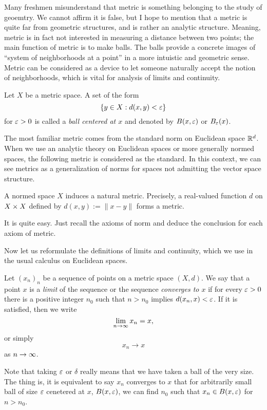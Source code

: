 \documentclass{../crs}
\begin{document}
Many freshmen misunderstand that metric is something belonging to the study of geoemtry.
We cannot affirm it is false, but I hope to mention that a metric is quite far from geometric structures, and is rather an analytic structure.
Meaning, metric is in fact not interested in measuring a distance between two points; the main function of metric is to make balls.
The balls provide a concrete images of ``system of neighborhoods at a point'' in a more intuistic and geometric sense.
Metric can be considered as a device to let someone naturally accept the notion of neighborhoods, which is vital for analysis of limits and continuity.

\begin{defn}
Let $X$ be a metric space.
A set of the form 
\[\{y\in X:d(x,y)<\varepsilon\}\]
for $\varepsilon>0$ is called a \emph{ball centered at $x$} and denoted by $B(x,\varepsilon)$ or $B_\varepsilon(x)$.
\end{defn}

The most familiar metric comes from the standard norm on Euclidean space $\mathbb{R}^d$.
When we use an analytic theory on Euclidean spaces or more generally normed spaces, the following metric is considered as the standard.
In this context, we can see metrics as a generalization of norms for spaces not admitting the vector space structure.

\begin{ex}
A normed space $X$ induces a natural metric.
Precisely, a real-valued function $d$ on $X\times X$ defined by $d(x,y):=\|x-y\|$ forms a metric.
\end{ex}
\begin{pf}
It is quite easy.
Just recall the axioms of norm and deduce the conclusion for each axiom of metric.
\end{pf}

Now let us reformulate the definitions of limits and continuity, which we use in the usual calculus on Euclidean spaces.

\begin{defn}
Let $(x_n)_n$ be a sequence of points on a metric space $(X,d)$.
We say that a point $x$ is a \emph{limit} of the sequence or the sequence \emph{converges to $x$} if for every $\varepsilon>0$ there is a positive integer $n_0$ such that $n>n_0$ implies $d(x_n,x)<\varepsilon$.
If it is satisfied, then we write
\[\lim_{n\to\oo}x_n=x,\]
or simply
\[x_n\to x\]
as $n\to\oo$.
\end{defn}

Note that taking $\varepsilon$ or $\delta$ really means that we have taken a ball of the very size.
The thing is, it is equivalent to say $x_n$ converges to $x$ that for arbitrarily small ball of size $\varepsilon$ cenetered at $x$, $B(x,\varepsilon)$, we can find $n_0$ such that $x_n\in B(x,\varepsilon)$ for $n>n_0$.
\end{document}
